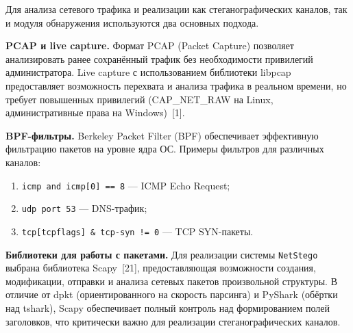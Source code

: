 Для анализа сетевого трафика и реализации как стеганографических каналов, так и модуля обнаружения используются два основных подхода.

\textbf{PCAP и live capture.} Формат PCAP (Packet Capture) позволяет анализировать ранее сохранённый трафик без необходимости привилегий администратора. Live capture с использованием библиотеки libpcap предоставляет возможность перехвата и анализа трафика в реальном времени, но требует повышенных привилегий (CAP\_NET\_RAW на Linux, административные права на Windows)~[1].

\textbf{BPF-фильтры.} Berkeley Packet Filter (BPF) обеспечивает эффективную фильтрацию пакетов на уровне ядра ОС. Примеры фильтров для различных каналов:
\begin{enumerate}[label=\arabic*)]
  \item \texttt{icmp and icmp[0] == 8} --- ICMP Echo Request;
  \item \texttt{udp port 53} --- DNS-трафик;
  \item \texttt{tcp[tcpflags] \& tcp-syn != 0} --- TCP SYN-пакеты.
\end{enumerate}

\textbf{Библиотеки для работы с пакетами.} Для реализации системы \texttt{NetStego} выбрана библиотека Scapy~[21], предоставляющая возможности создания, модификации, отправки и анализа сетевых пакетов произвольной структуры. В отличие от dpkt (ориентированного на скорость парсинга) и PyShark (обёртки над tshark), Scapy обеспечивает полный контроль над формированием полей заголовков, что критически важно для реализации стеганографических каналов.

